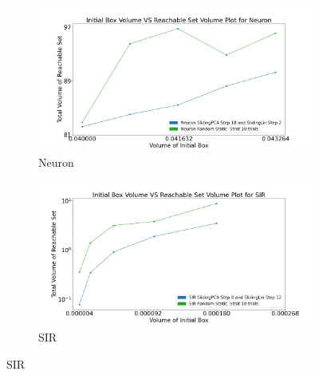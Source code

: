 \begin{figure}[h!]
    \hspace{-1.5em}
    \begin{subfigure}{0.5\textwidth}
    \centering
    \includegraphics[width=1.1\textwidth, height=0.75\textwidth]{figures/InitVolVSReachVol/NeuronInitReachVolRanStrat.png}
    \caption{Neuron}
    \end{subfigure}%
    \begin{subfigure}{0.5\textwidth}
    \centering
    \includegraphics[width=1.1\textwidth, height=0.75\textwidth]{figures/InitVolVSReachVol/SIRInitReachVolRanStrat.png}
    \caption{SIR}
    \end{subfigure}


\end{figure}
